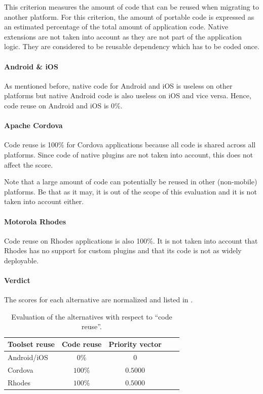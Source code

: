This criterion measures the amount of code that can be reused when migrating to another platform. For this criterion, the amount of portable code is expressed as an estimated percentage of the total amount of application code. Native extensions are not taken into account as they are not part of the application logic. They are considered to be reusable dependency which has to be coded once. 

\paragraph{Android \& iOS} As mentioned before, native code for Android and iOS is useless on other platforms but native Android code is also useless on iOS and vice versa. Hence, code reuse on Android and iOS is 0\%.

\paragraph{Apache Cordova} Code reuse is 100\% for Cordova applications because all code is shared across all platforms. Since code of native plugins are not taken into account, this does not affect the score.

Note that a large amount of code can potentially be reused in other (non-mobile) platforms. Be that as it may, it is out of the scope of this evaluation and it is not taken into account either.

\paragraph{Motorola Rhodes} Code reuse on Rhodes applications is also 100\%. It is not taken into account that Rhodes has no support for custom plugins and that its code is not as widely deployable.

\paragraph{Verdict} The scores for each alternative are normalized and listed in . 

\begin{table}[h!]
    \begin{center}
        \begin{tabular}{lcccl}
            \hline
            \textbf{Toolset reuse} & Code reuse & Priority vector \\
            \hline
            Android/iOS            & $0\%$       & $0$            \\
            Cordova                & $100\%$     & $0.5000$       \\
            Rhodes                 & $100\%$     & $0.5000$       \\
            \hline
        \end{tabular}
        \caption{Evaluation of the alternatives with respect to ``code reuse''.}
        \label{tab:cr}
    \end{center}
\end{table}

